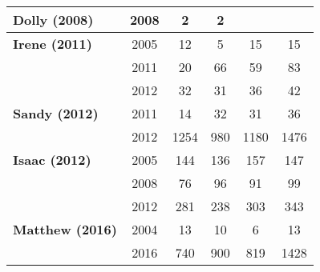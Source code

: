 {\begin{tabular}{lccccc}
    \midrule 
    \textbf{Dolly (2008)} & 2008 & 2 & 2 &  &  \\   
    \midrule 
    \textbf{Irene (2011)} & 2005 & 12 & 5 & 15 & 15 \\
     & 2011 & 20 & 66 & 59 & 83 \\
     & 2012 & 32 & 31 & 36 & 42 \\   
    \midrule 
    \textbf{Sandy (2012)} & 2011 & 14 & 32 & 31 & 36 \\
     & 2012 & 1254 & 980 & 1180 & 1476 \\   
    \midrule 
    \textbf{Isaac (2012)} & 2005 & 144 & 136 & 157 & 147 \\
     & 2008 & 76 & 96 & 91 & 99 \\
     & 2012 & 281 & 238 & 303 & 343 \\   
    \midrule 
    \textbf{Matthew (2016)} & 2004 & 13 & 10 & 6 & 13 \\
        & 2016 & 740 & 900 & 819 & 1428 \\     
    \bottomrule \end{tabular}}